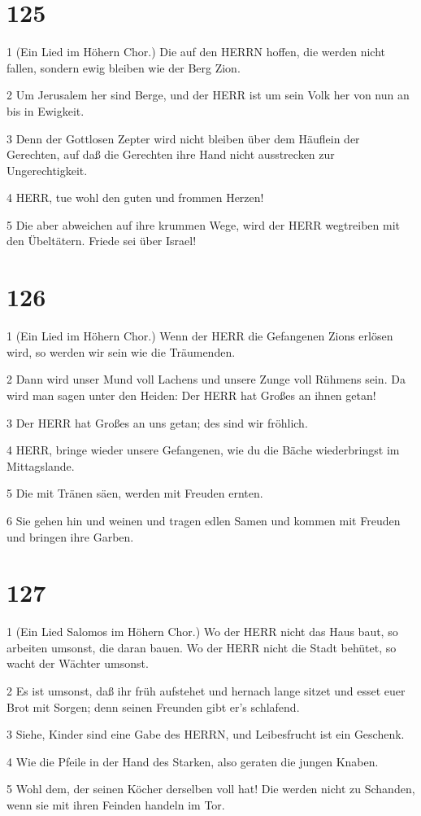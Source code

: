\chapter{125}

\par 1 (Ein Lied im Höhern Chor.) Die auf den HERRN hoffen, die werden nicht fallen, sondern ewig bleiben wie der Berg Zion.
\par 2 Um Jerusalem her sind Berge, und der HERR ist um sein Volk her von nun an bis in Ewigkeit.
\par 3 Denn der Gottlosen Zepter wird nicht bleiben über dem Häuflein der Gerechten, auf daß die Gerechten ihre Hand nicht ausstrecken zur Ungerechtigkeit.
\par 4 HERR, tue wohl den guten und frommen Herzen!
\par 5 Die aber abweichen auf ihre krummen Wege, wird der HERR wegtreiben mit den Übeltätern. Friede sei über Israel!

\chapter{126}

\par 1 (Ein Lied im Höhern Chor.) Wenn der HERR die Gefangenen Zions erlösen wird, so werden wir sein wie die Träumenden.
\par 2 Dann wird unser Mund voll Lachens und unsere Zunge voll Rühmens sein. Da wird man sagen unter den Heiden: Der HERR hat Großes an ihnen getan!
\par 3 Der HERR hat Großes an uns getan; des sind wir fröhlich.
\par 4 HERR, bringe wieder unsere Gefangenen, wie du die Bäche wiederbringst im Mittagslande.
\par 5 Die mit Tränen säen, werden mit Freuden ernten.
\par 6 Sie gehen hin und weinen und tragen edlen Samen und kommen mit Freuden und bringen ihre Garben.

\chapter{127}

\par 1 (Ein Lied Salomos im Höhern Chor.) Wo der HERR nicht das Haus baut, so arbeiten umsonst, die daran bauen. Wo der HERR nicht die Stadt behütet, so wacht der Wächter umsonst.
\par 2 Es ist umsonst, daß ihr früh aufstehet und hernach lange sitzet und esset euer Brot mit Sorgen; denn seinen Freunden gibt er's schlafend.
\par 3 Siehe, Kinder sind eine Gabe des HERRN, und Leibesfrucht ist ein Geschenk.
\par 4 Wie die Pfeile in der Hand des Starken, also geraten die jungen Knaben.
\par 5 Wohl dem, der seinen Köcher derselben voll hat! Die werden nicht zu Schanden, wenn sie mit ihren Feinden handeln im Tor.

